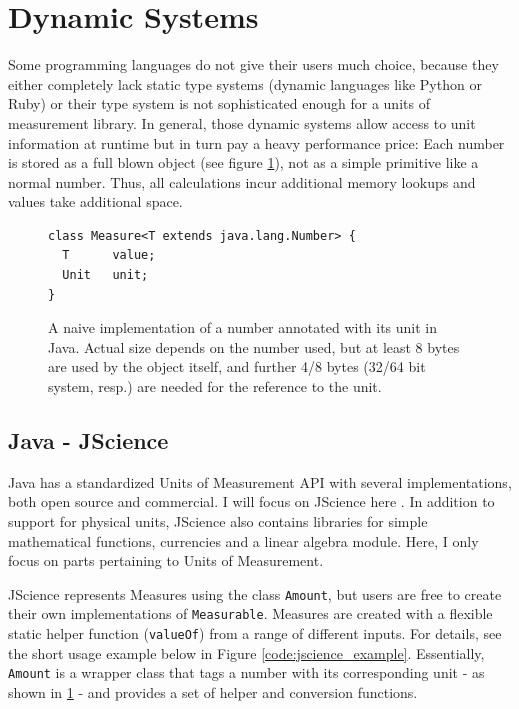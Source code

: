 \documentclass[12pt,oneside,a4paper]{scrbook}
\theoremstyle{definition}
\begin{document}
\section{Dynamic Systems}

Some programming languages do not give their users much choice, because they either completely lack static type systems (dynamic languages like Python or Ruby) or their type system is not sophisticated enough for a units of measurement library. In general, those dynamic systems allow access to unit information at runtime but in turn pay a heavy performance price: Each number is stored as a full blown object (see figure \ref{code:naive_java_measure}), not as a simple primitive like a normal number. Thus, all calculations incur additional memory lookups and values take additional space.

\begin{figure}
\begin{verbatim}
class Measure<T extends java.lang.Number> {
  T      value;
  Unit   unit;
}
\end{verbatim}
\caption{A naive implementation of a number annotated with its unit in Java. Actual size depends on the number used, but at least 8 bytes are used by the object itself, and further 4/8 bytes (32/64 bit system, resp.) are needed for the reference to the unit.}
\label{code:naive_java_measure}
\end{figure}



\subsection{Java - JScience}

Java has a standardized Units of Measurement API \citep{Units13} with several implementations, both open source and commercial. I will focus on JScience here \citep{Dautelle11}. In addition to support for physical units, JScience also contains libraries for simple mathematical functions, currencies and a linear algebra module. Here, I only focus on parts pertaining to Units of Measurement.

JScience represents Measures using the class \verb/Amount/, but users are free to create their own implementations of \verb/Measurable/. Measures are created with a flexible static helper function (\verb/valueOf/) from a range of different inputs. For details, see the short usage example below in Figure \ref{code:jscience_example}. Essentially, \verb/Amount/ is a wrapper class that tags a number with its corresponding unit - as shown in \ref{code:naive_java_measure} - and provides a set of helper and conversion functions.
\end{document}
